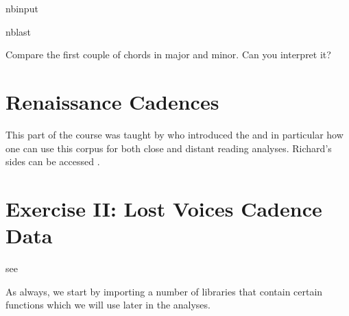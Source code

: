 \documentclass[letterpaper,10pt,english]{sphinxmanual}
\begin{document}
\begin{sphinxuseclass}{nbinput}
\begin{sphinxuseclass}{nblast}
{
\begin{sphinxVerbatim}[commandchars=\\\{\}]
\llap{\color{nbsphinxin}[ ]:\,\hspace{\fboxrule}\hspace{\fboxsep}}
\end{sphinxVerbatim}
}

\end{sphinxuseclass}
\end{sphinxuseclass}
\sphinxAtStartPar
Compare the first couple of chords in major and minor. Can you interpret it?

\sphinxAtStartPar
{}


\chapter{Renaissance Cadences}
\label{\detokenize{04_renaissance_cadences:renaissance-cadences}}\label{\detokenize{04_renaissance_cadences::doc}}
\sphinxAtStartPar
This part of the course was taught by 
who introduced the  and in particular how one can use this corpus for both close and distant reading analyses.
Richard’s sides can be accessed .


\chapter{Exercise II: Lost Voices Cadence Data}
\label{\detokenize{exercises/02_exercise:Exercise-II:-Lost-Voices-Cadence-Data}}\label{\detokenize{exercises/02_exercise::doc}}
\sphinxAtStartPar
{}

\sphinxAtStartPar
see 

\sphinxAtStartPar
As always, we start by importing a number of libraries that contain certain functions which we will use later in the analyses.
\end{document}
